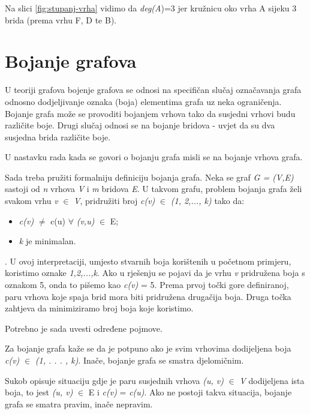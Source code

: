 \documentclass[times, utf8, zavrsni, numeric]{fer}
\begin{document}
Na slici \ref{fig:stupanj-vrha} vidimo da \textit{deg(A})=3 jer kružnicu oko vrha A sijeku 3 brida (prema vrhu F, D te B).\\



\newpage
\section{Bojanje grafova}
U teoriji grafova bojenje grafova se odnosi na specifičan slučaj označavanja grafa odnosno
dodjeljivanje oznaka (boja) elementima grafa uz neka ograničenja.
Bojanje grafa može se provoditi bojanjem vrhova tako da susjedni vrhovi budu različite boje. Drugi slučaj odnosi se na bojanje bridova - uvjet da su dva susjedna brida različite boje.

U nastavku rada kada se govori o bojanju grafa misli se na bojanje vrhova grafa.

Sada treba pružiti formalniju definiciju bojanja grafa. Neka se graf \textit{G = (V,E)} sastoji od \textit{n} vrhova \textit{V} i \textit{m} bridova \textit{E}. U takvom grafu, problem bojanja grafa želi svakom vrhu \textit{v} $\in$  \textit{V}, pridružiti broj \textit{c(v)} $\in$ \textit{(1, 2,..., k)} tako da:
\begin{itemize}
	\item \textit{c(v)}  $\neq$  c(u) $\forall$ \textit{(v,u)} $\in$ E; 
	\item \textit{k} je minimalan.
\end{itemize}.
U ovoj interpretaciji, umjesto stvarnih boja korištenih u početnom primjeru, koristimo oznake \textit{1,2,...,k}. Ako u rješenju se pojavi da je vrhu \textit{v} pridružena boja s oznakom 5, onda to pišemo kao \textit{c(v)} = 5. Prema prvoj točki gore definiranoj, paru vrhova koje spaja brid mora biti pridružena drugačija boja. Druga točka zahtjeva da minimiziramo broj boja koje koristimo.

\vspace{2mm}
Potrebno je sada uvesti određene pojmove.

Za bojanje grafa kaže se da je potpuno ako je svim vrhovima dodijeljena boja \textit{c(v)} $\in$ \textit {(1, . . . , k)}. Inače, bojanje grafa se smatra djelomičnim.

Sukob opisuje situaciju gdje je paru susjednih vrhova \textit{(u, v)} $\in$ \textit{V} dodijeljena ista boja, to jest \textit{{(u, v)}} $\in$ E i \textit{c(v)} = \textit{c(u)}. Ako ne postoji takva situacija, bojanje grafa se smatra pravim, inače nepravim.
\end{document}
